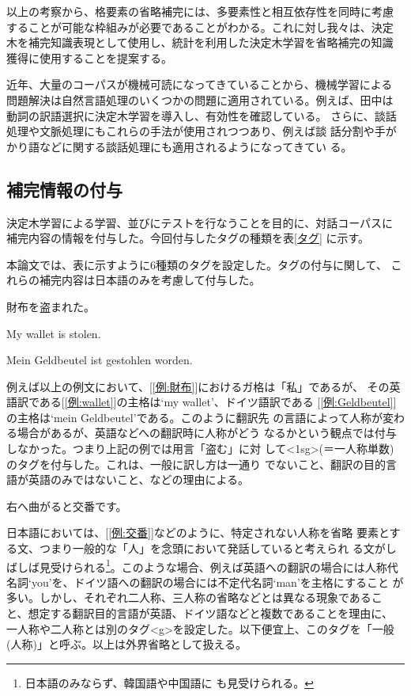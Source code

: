 以上の考察から、格要素の省略補完には、多要素性と相互依存性を同時に考慮
することが可能な枠組みが必要であることがわかる。これに対し我々は、決定
木を補完知識表現として使用し、統計を利用した決定木学習を省略補完の知識
獲得に使用することを提案する。

近年、大量のコーパスが機械可読になってきていることから、機械学習による
問題解決は自然言語処理のいくつかの問題に適用されている。例えば、田中は
動詞の訳語選択に決定木学習を導入し、有効性を確認している{}\cite{田中}。
さらに、談話処理や文脈処理にもこれらの手法が使用されつつあり、例えば談
話分割や手がかり語などに関する談話処理にも適用されるようになってきてい
る{}\cite{Summary}。



\subsection{補完情報の付与}
\label{節:補完情報}

決定木学習による学習、並びにテストを行なうことを目的に、対話コーパスに
補完内容の情報を付与した。今回付与したタグの種類を表\ref{タグ} に示す。

本論文では、表に示すように6種類のタグを設定した。タグの付与に関して、
これらの補完内容は日本語のみを考慮して付与した。

\begin{example}
\item 財布を盗まれた。\label{例:財布}
\item My wallet is stolen.\label{例:wallet}
\item Mein Geldbeutel ist gestohlen worden.\label{例:Geldbeutel}
\end{example}

例えば以上の例文において、[\ref{例:財布}]におけるガ格は「私」であるが、
その英語訳である[\ref{例:wallet}]の主格は`my wallet'、ドイツ語訳である
[\ref{例:Geldbeutel}]の主格は`mein Geldbeutel'である。このように翻訳先
の言語によって人称が変わる場合があるが、英語などへの翻訳時に人称がどう
なるかという観点では付与しなかった。つまり上記の例では用言「盗む」に対
して<1sg>(＝一人称単数)のタグを付与した。これは、一般に訳し方は一通り
でないこと、翻訳の目的言語が英語のみではないこと、などの理由による。

\begin{example}
\item 右へ曲がると交番です。\label{例:交番}
\end{example}

日本語においては、[\ref{例:交番}]などのように、特定されない人称を省略
要素とする文、つまり一般的な「人」を念頭において発話していると考えられ
る文がしばしば見受けられる\footnote{日本語のみならず、韓国語や中国語に
も見受けられる。}。このような場合、例えば英語への翻訳の場合には人称代
名詞`you'を、ドイツ語への翻訳の場合には不定代名詞`man'を主格にすること
が多い。しかし、それぞれ二人称、三人称の省略などとは異なる現象であるこ
と、想定する翻訳目的言語が英語、ドイツ語などと複数であることを理由に、
一人称や二人称とは別のタグ<g>を設定した。以下便宜上、このタグを「一般
(人称)」と呼ぶ。以上は外界省略として扱える。

